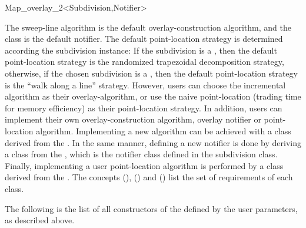 \begin{ccRefClass}{Map_overlay_2<Subdivision,Notifier>}
\begin{ccAdvanced}
The sweep-line algorithm is the default overlay-construction algorithm,
and the  class is the default notifier.
The default point-location strategy is determined according the 
subdivision instance: If the subdivision is a , 
then the default point-location strategy is the randomized trapezoidal 
decomposition strategy, otherwise,
if the chosen subdivision is a , 
then the default point-location strategy is the ``walk along a line'' 
strategy. 
However, users can choose the incremental algorithm as their 
overlay-algorithm, or use the naive point-location 
(trading time for memory efficiency) as their point-location strategy.
In addition, users can implement their own overlay-construction 
algorithm, overlay notifier or point-location algorithm. 
Implementing a new algorithm can be achieved with a class derived 
from the . 
In the same manner, defining a new notifier is done by deriving a 
class from the , which is the 
notifier class defined in the subdivision class.
Finally, implementing a user point-location algorithm is performed by a 
class derived from the .
The concepts  
(), 
 () and 
 () 
list the set of requirements of each class.

The following is the list of all constructors of the \ccRefClass
defined by the user parameters, as described above.
  
  


  



\end{ccAdvanced}
\end{ccRefClass}
